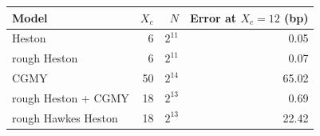 \begin{tabular}{lrrr}
\toprule
Model & $X_c$ & $N$ & Error at $X_c=12$ (bp)\\
\midrule
Heston & 6 & $2^{11}$ & 0.05\\
rough Heston & 6 & $2^{11}$ & 0.07\\
CGMY & 50 & $2^{14}$ & 65.02\\
rough Heston + CGMY & 18 & $2^{13}$ & 0.69\\
rough Hawkes Heston & 18 & $2^{13}$ & 22.42\\
\bottomrule
\end{tabular}
